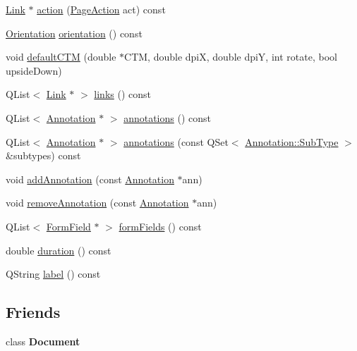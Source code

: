 \begin{DoxyCompactItemize}
\item 
\hyperlink{class_poppler_1_1_link}{Link} $\ast$ \hyperlink{class_poppler_1_1_page_aae0237db3c5b8f7276f36b852af46f27}{action} (\hyperlink{class_poppler_1_1_page_ac77a0b29e76e6ddcb6fb177ef3e3396f}{Page\+Action} act) const
\item 
\hyperlink{class_poppler_1_1_page_a1075c38ddba641b4dc23ee4860302cc2}{Orientation} \hyperlink{class_poppler_1_1_page_a168a4a6c452eb365a4cd7170d6a98e29}{orientation} () const
\item 
void \hyperlink{class_poppler_1_1_page_a5028c2c7b89bcba5124d12f3c8de95ba}{default\+C\+TM} (double $\ast$C\+TM, double dpiX, double dpiY, int rotate, bool upside\+Down)
\item 
Q\+List$<$ \hyperlink{class_poppler_1_1_link}{Link} $\ast$ $>$ \hyperlink{class_poppler_1_1_page_ac67e76e3cb301bba5c25e127cc47e0b8}{links} () const
\item 
Q\+List$<$ \hyperlink{class_poppler_1_1_annotation}{Annotation} $\ast$ $>$ \hyperlink{class_poppler_1_1_page_a74edabc4ccb349b5227cec4810aed310}{annotations} () const
\item 
Q\+List$<$ \hyperlink{class_poppler_1_1_annotation}{Annotation} $\ast$ $>$ \hyperlink{class_poppler_1_1_page_a46f2df75edea8d9fb0c59573304e1b99}{annotations} (const Q\+Set$<$ \hyperlink{class_poppler_1_1_annotation_a2d592999c330949d64679cfa9e81113f}{Annotation\+::\+Sub\+Type} $>$ \&subtypes) const
\item 
void \hyperlink{class_poppler_1_1_page_a1235aa9d06e6f66c38f9bab4ac6a5bef}{add\+Annotation} (const \hyperlink{class_poppler_1_1_annotation}{Annotation} $\ast$ann)
\item 
void \hyperlink{class_poppler_1_1_page_af9f03e0b230b3f432a7f4672d3403a0f}{remove\+Annotation} (const \hyperlink{class_poppler_1_1_annotation}{Annotation} $\ast$ann)
\item 
Q\+List$<$ \hyperlink{class_poppler_1_1_form_field}{Form\+Field} $\ast$ $>$ \hyperlink{class_poppler_1_1_page_aa7073bd787eb01617a2b530557397a59}{form\+Fields} () const
\item 
double \hyperlink{class_poppler_1_1_page_a7acb7886f86577c4abd5a32c794d36f8}{duration} () const
\item 
Q\+String \hyperlink{class_poppler_1_1_page_a7592a930424ad1e9a98565afb8cd61bf}{label} () const
\end{DoxyCompactItemize}
\subsection*{Friends}
\begin{DoxyCompactItemize}
\item 
\mbox{\label{class_poppler_1_1_page_a883538034e58fc5c0de7d4e4cab3cef7}} 
class {\bfseries Document}
\end{DoxyCompactItemize}


